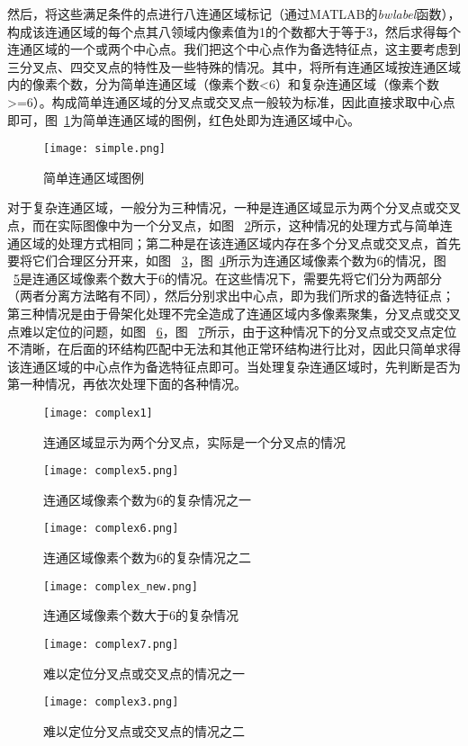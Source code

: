 然后，将这些满足条件的点进行八连通区域标记（通过MATLAB的\emph{bwlabel}函数），构成该连通区域的每个点其八领域内像素值为1的个数都大于等于3，然后求得每个连通区域的一个或两个中心点。我们把这个中心点作为备选特征点，这主要考虑到三分叉点、四交叉点的特性及一些特殊的情况。其中，将所有连通区域按连通区域内的像素个数，分为简单连通区域（像素个数<6）和复杂连通区域（像素个数>=6）。构成简单连通区域的分叉点或交叉点一般较为标准，因此直接求取中心点即可，图~\ref{lian1}为简单连通区域的图例，红色处即为连通区域中心。
   \begin{figure}[ht!]
   \centering
  \texttt{[image: simple.png]}
  \caption{简单连通区域图例}
    \label{lian1}
 \end{figure}
对于复杂连通区域，一般分为三种情况，一种是连通区域显示为两个分叉点或交叉点，而在实际图像中为一个分叉点，如图 ~\ref{lian2}所示，这种情况的处理方式与简单连通区域的处理方式相同；第二种是在该连通区域内存在多个分叉点或交叉点，首先要将它们合理区分开来，如图 ~\ref{lian3}，图~\ref{lian4}所示为连通区域像素个数为6的情况，图 ~\ref{lian5}是连通区域像素个数大于6的情况。在这些情况下，需要先将它们分为两部分（两者分离方法略有不同），然后分别求出中心点，即为我们所求的备选特征点；第三种情况是由于骨架化处理不完全造成了连通区域内多像素聚集，分叉点或交叉点难以定位的问题，如图 ~\ref{lian6}，图 ~\ref{lian7}所示，由于这种情况下的分叉点或交叉点定位不清晰，在后面的环结构匹配中无法和其他正常环结构进行比对，因此只简单求得该连通区域的中心点作为备选特征点即可。当处理复杂连通区域时，先判断是否为第一种情况，再依次处理下面的各种情况。
   \begin{figure}[ht!]
   \centering
  \texttt{[image: complex1]}
  \caption{连通区域显示为两个分叉点，实际是一个分叉点的情况}
    \label{lian2}
 \end{figure}
    \begin{figure}[ht!]
   \centering
  \texttt{[image: complex5.png]}
  \caption{连通区域像素个数为6的复杂情况之一}
    \label{lian3}
 \end{figure}
    \begin{figure}[ht!]
   \centering
  \texttt{[image: complex6.png]}
  \caption{连通区域像素个数为6的复杂情况之二}
    \label{lian4}
 \end{figure}
    \begin{figure}[ht!]
   \centering
  \texttt{[image: complex\_new.png]}
  \caption{连通区域像素个数大于6的复杂情况}
    \label{lian5}
 \end{figure}
    \begin{figure}[ht!]
   \centering
  \texttt{[image: complex7.png]}
  \caption{难以定位分叉点或交叉点的情况之一}
    \label{lian6}
 \end{figure}
    \begin{figure}[ht!]
   \centering
  \texttt{[image: complex3.png]}
  \caption{难以定位分叉点或交叉点的情况之二}
    \label{lian7}
 \end{figure}

